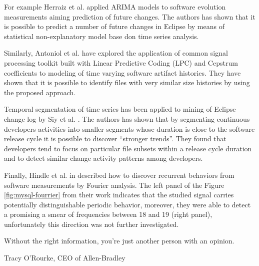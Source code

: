 For example Herraiz et al. \cite{citeulike:6544685} applied ARIMA models to software evolution measurements aiming 
prediction of future changes. The authors has shown that it is possible to predict a number of future changes in 
Eclipse by means of statistical non-explanatory model base don time series analysis. 

Similarly, Antoniol et al. \cite{citeulike:3378725} have explored the application of common signal processing toolkit 
built with Linear Predictive Coding (LPC) and Cepstrum coefficients to modeling of time varying software artifact 
histories. They have shown that it is possible to identify files with very similar size histories by using the 
proposed approach.

Temporal segmentation of time series has been applied to mining of Eclipse change log by Siy et al. \cite{citeulike:10896305}.
The authors has shown that by segmenting continuous developers activities into smaller segments whose duration is close 
to the software release cycle it is possible to discover ``stronger trends''. They found that developers tend to focus 
on particular file subsets within a release cycle duration and to detect similar change activity patterns among developers.

Finally, Hindle et al. in \cite{citeulike:10377345} described how to discover recurrent behaviors from software measurements 
by Fourier analysis. The left panel of the Figure \ref{fig:mysql-fourrier} from their work indicates that the studied 
signal carries potentially distinguishable periodic behavior, moreover, they were able to detect a promising a smear 
of frequencies between 18 and 19 (right panel), unfortunately this direction was not further investigated.

\epigraph{Without the right information, you're just another person with an opinion.}{Tracy O'Rourke, CEO of Allen-Bradley}